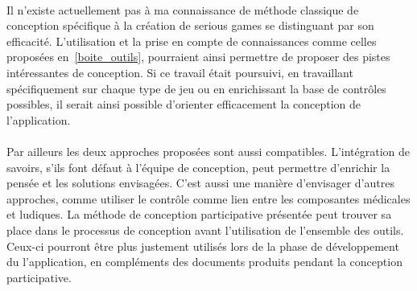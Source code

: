 \paragraph{} Il n'existe actuellement pas à ma connaissance de méthode classique de conception spécifique à la création de serious games se distinguant par son efficacité. L'utilisation et la prise en compte de connaissances comme celles proposées en~\ref{boite_outils}, pourraient ainsi permettre de proposer des pistes intéressantes de conception. Si ce travail était poursuivi, en travaillant spécifiquement sur chaque type de jeu ou en enrichissant la base de contrôles possibles, il serait ainsi possible d'orienter efficacement la conception de l'application.

\paragraph{} Par ailleurs les deux approches proposées sont aussi compatibles. L'intégration de savoirs, s'ils font défaut à l'équipe de conception, peut permettre d'enrichir la pensée et les solutions envisagées. C'est aussi une manière d'envisager d'autres approches, comme utiliser le contrôle comme lien entre les composantes médicales et ludiques. La méthode de conception participative présentée peut trouver sa place dans le processus de conception avant l'utilisation de l'ensemble des outils. Ceux-ci pourront être plus justement utilisés lors de la phase de développement du l'application, en compléments des documents produits pendant la conception participative.
	

%	
